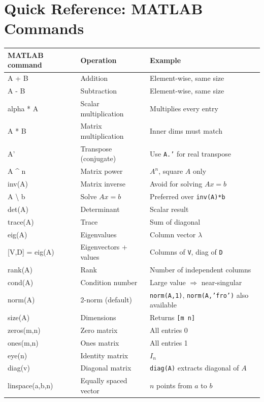 \section{Quick Reference: MATLAB Commands}
\label{sec:app_matlab_ref}

\begin{center}
	\renewcommand{\arraystretch}{1.35}
	\begin{tabular}{>{\ttfamily\small}l >{\small}l >{\small}l}
		\toprule
		\normalfont\textbf{MATLAB command} & \textbf{Operation} &
		\textbf{Example} \\
		\midrule
		A + B               & Addition              & Element-wise, same size \\
		A - B               & Subtraction           & Element-wise, same size \\
		alpha * A           & Scalar multiplication & Multiplies every entry \\
		A * B               & Matrix multiplication & Inner dims must match \\
		A'                  & Transpose (conjugate) & Use \texttt{A.'} for real transpose \\
		A \textasciicircum{} n & Matrix power       & $A^n$, square $A$ only \\
		inv(A)              & Matrix inverse        & Avoid for solving $Ax=b$ \\
		A \textbackslash{} b & Solve $Ax = b$       & Preferred over \texttt{inv(A)*b} \\
		det(A)              & Determinant           & Scalar result \\
		trace(A)            & Trace                 & Sum of diagonal \\
		eig(A)              & Eigenvalues           & Column vector $\lambda$ \\
		{[}V,D{]} = eig(A)  & Eigenvectors + values & Columns of \texttt{V}, diag of \texttt{D} \\
		rank(A)             & Rank                  & Number of independent columns \\
		cond(A)             & Condition number      & Large value $\Rightarrow$ near-singular \\
		norm(A)             & 2-norm (default)      & \texttt{norm(A,1)}, \texttt{norm(A,'fro')} also available \\
		size(A)             & Dimensions            & Returns \texttt{[m n]} \\
		zeros(m,n)          & Zero matrix           & All entries 0 \\
		ones(m,n)           & Ones matrix           & All entries 1 \\
		eye(n)              & Identity matrix       & $I_n$ \\
		diag(v)             & Diagonal matrix       & \texttt{diag(A)} extracts diagonal of $A$ \\
		linspace(a,b,n)     & Equally spaced vector & $n$ points from $a$ to $b$ \\
		\bottomrule
	\end{tabular}
\end{center}

